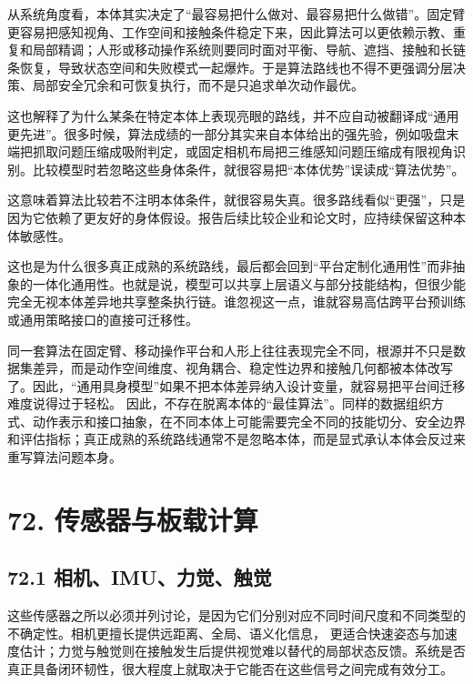 从系统角度看，本体其实决定了“最容易把什么做对、最容易把什么做错”。固定臂更容易把感知视角、工作空间和接触条件稳定下来，因此算法可以更依赖示教、重复和局部精调；人形或移动操作系统则要同时面对平衡、导航、遮挡、接触和长链条恢复，导致状态空间和失败模式一起爆炸。于是算法路线也不得不更强调分层决策、局部安全冗余和可恢复执行，而不是只追求单次动作最优。

这也解释了为什么某条在特定本体上表现亮眼的路线，并不应自动被翻译成“通用更先进”。很多时候，算法成绩的一部分其实来自本体给出的强先验，例如吸盘末端把抓取问题压缩成吸附判定，或固定相机布局把三维感知问题压缩成有限视角识别。比较模型时若忽略这些身体条件，就很容易把“本体优势”误读成“算法优势”。

这意味着算法比较若不注明本体条件，就很容易失真。很多路线看似“更强”，只是因为它依赖了更友好的身体假设。报告后续比较企业和论文时，应持续保留这种本体敏感性。

这也是为什么很多真正成熟的系统路线，最后都会回到“平台定制化通用性”而非抽象的一体化通用性。也就是说，模型可以共享上层语义与部分技能结构，但很少能完全无视本体差异地共享整条执行链。谁忽视这一点，谁就容易高估跨平台预训练或通用策略接口的直接可迁移性。

同一套算法在固定臂、移动操作平台和人形上往往表现完全不同，根源并不只是数据集差异，而是动作空间维度、视角耦合、稳定性边界和接触几何都被本体改写了。因此，“通用具身模型”如果不把本体差异纳入设计变量，就容易把平台间迁移难度说得过于轻松。 因此，不存在脱离本体的“最佳算法”。同样的数据组织方式、动作表示和接口抽象，在不同本体上可能需要完全不同的技能切分、安全边界和评估指标；真正成熟的系统路线通常不是忽略本体，而是显式承认本体会反过来重写算法问题本身。

\section*{72. 传感器与板载计算}

\subsection*{72.1 相机、IMU、力觉、触觉}


这些传感器之所以必须并列讨论，是因为它们分别对应不同时间尺度和不同类型的不确定性。相机更擅长提供远距离、全局、语义化信息，\texttt{} 更适合快速姿态与加速度估计；力觉与触觉则在接触发生后提供视觉难以替代的局部状态反馈。系统是否真正具备闭环韧性，很大程度上就取决于它能否在这些信号之间完成有效分工。

